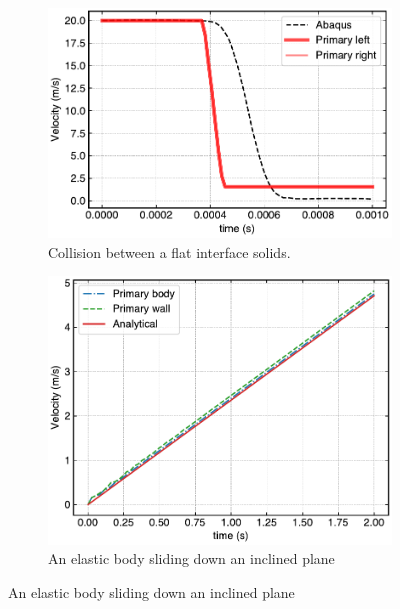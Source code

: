 \begin{figure}[!htpb]
  \centering
  \begin{subfigure}{0.48\textwidth}
    \centering
    \includegraphics[width=1.\textwidth]{figures/csph/figures/yan_2021_linear_interface_primary_vs_secondary/mohseni_vyas_primary_left_velocity_vs_time}
    \caption{Collision between a flat interface solids.}\label{fig:results-yan-linear-primary-vs-secondary}
  \end{subfigure}
  \begin{subfigure}{0.48\textwidth}
    \centering
    \includegraphics[width=1.\textwidth]{figures/csph/figures/mohseni_2021_free_sliding_on_a_slope_primary_vs_secondary/mohseni_primary_body_velocity_vs_time}
    \caption{An elastic body sliding down an inclined plane}\label{fig:mps}
  \end{subfigure}


\end{figure}
